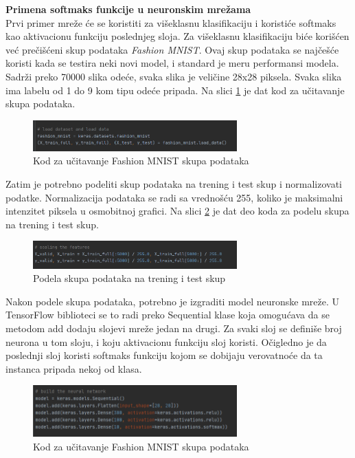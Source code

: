 \documentclass[a4paper,12pt]{report}
\begin{document}
\textbf{Primena softmaks funkcije u neuronskim mrežama}\\

Prvi primer mreže će se koristiti za višeklasnu klasifikaciju i koristiće softmaks kao aktivacionu funkciju poslednjeg sloja. Za višeklasnu klasifikaciju biće korišćen već prečišćeni skup podataka \textit{Fashion MNIST}. Ovaj skup podataka se najčešće koristi kada se testira neki novi model, i standard je meru performansi modela. Sadrži preko 70000 slika odeće, svaka slika je veličine 28x28 piksela. Svaka slika ima labelu od 1 do 9 kom tipu odeće pripada. Na slici \ref{fig:loadfmnist} je dat kod za učitavanje skupa podataka. 

\begin{figure}[h]
    \centering
    \includegraphics[width=0.7\textwidth]{load_fashion_MNIST.png}
    \caption{Kod za učitavanje Fashion MNIST skupa podataka}\label{fig:loadfmnist}
\end{figure}

Zatim je potrebno podeliti skup podataka na trening i test skup i normalizovati podatke. Normalizacija podataka se radi sa vrednošću 255, koliko je maksimalni intenzitet piksela u osmobitnoj grafici. Na slici \ref{fig:train_test_fashion_mnist} je dat deo koda za podelu skupa na trening i test skup.

\begin{figure}[h]
    \centering
    \includegraphics[width=0.7\textwidth]{train_test_fashion_mnist.png}
    \caption{Podela skupa podataka na trening i test skup}\label{fig:train_test_fashion_mnist}
\end{figure}

Nakon podele skupa podataka, potrebno je izgraditi model neuronske mreže. U TensorFlow biblioteci se to radi preko Sequential klase koja omogućava da se metodom add dodaju slojevi mreže jedan na drugi. Za svaki sloj se definiše broj neurona u tom sloju, i koju aktivacionu funkciju sloj koristi. Očigledno je da poslednji sloj koristi softmaks funkciju kojom se dobijaju verovatnoće da ta instanca pripada nekoj od klasa.

\begin{figure}[h]
    \centering
    \includegraphics[width=0.7\textwidth]{NN_model_FMNIST.png}
    \caption{Kod za učitavanje Fashion MNIST skupa podataka}\label{fig:NN_model_FMNIST}
\end{figure}
\end{document}
